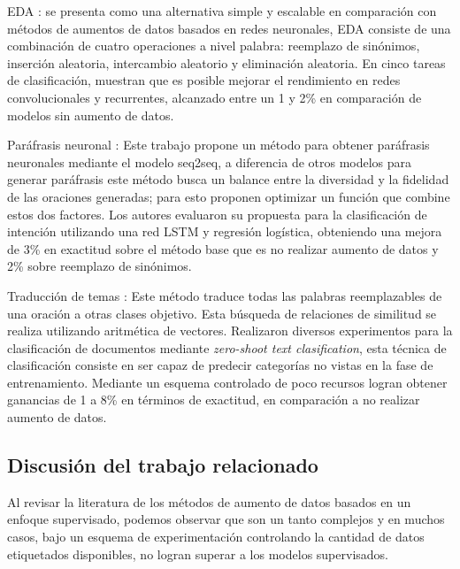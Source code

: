 EDA \citep{wei2019eda}: se presenta como una alternativa simple y escalable en comparación con métodos de aumentos de datos basados en redes neuronales, EDA consiste de una combinación de cuatro operaciones a nivel palabra: reemplazo de sinónimos, inserción aleatoria, intercambio aleatorio y eliminación aleatoria. En cinco tareas de clasificación, muestran que es posible mejorar  el rendimiento en redes convolucionales y recurrentes, alcanzado entre un 1 y 2\% en comparación de modelos sin aumento de datos.

Paráfrasis neuronal \citep{kumar2019submodular}: Este trabajo propone un método para obtener paráfrasis neuronales mediante el modelo seq2seq, a diferencia de otros modelos para generar paráfrasis este método busca un balance entre la diversidad y la fidelidad de las oraciones generadas; para esto proponen optimizar un función que combine estos dos factores. Los autores evaluaron su propuesta para la clasificación de intención utilizando una red LSTM y regresión logística, obteniendo una mejora de 3\% en exactitud sobre el método base que es no realizar aumento de datos y 2\% sobre reemplazo de sinónimos.

Traducción de temas \citep{zhang2019integrating}: Este método traduce todas las palabras reemplazables de una oración a otras clases objetivo. Esta búsqueda de relaciones de similitud se realiza utilizando aritmética de vectores. Realizaron diversos experimentos para la clasificación de documentos mediante \textit{zero-shoot text clasification}, esta técnica de clasificación consiste en ser capaz de predecir categorías no vistas en la fase de entrenamiento. Mediante un esquema controlado de poco recursos logran obtener ganancias de 1 a 8\% en términos de exactitud, en comparación a no realizar aumento de datos.


\subsection{Discusión del trabajo relacionado}

Al revisar la literatura de los métodos de aumento de datos basados en un enfoque supervisado, podemos observar que son un tanto complejos y en muchos casos, bajo un esquema de experimentación controlando la cantidad de datos etiquetados disponibles, no logran superar a los modelos supervisados.

